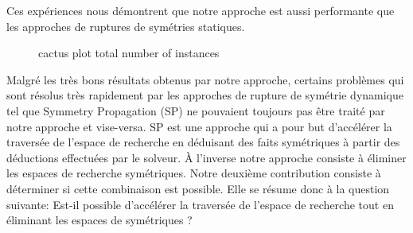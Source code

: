 Ces expériences nous démontrent que notre approche est aussi performante que les approches de ruptures de symétries statiques.
\begin{figure}[!htbp]
	\centering
	\qquad
	\caption{cactus plot  total number of instances}%
	\label{fig:frcactus}%
\end{figure}

Malgré les très bons résultats obtenus par notre approche, certains problèmes qui sont résolus très 
rapidement par les approches de rupture de symétrie dynamique tel que  Symmetry Propagation (SP) ne pouvaient toujours pas être traité par notre approche et vise-versa.
SP est une approche qui a pour but d'accélérer la traversée de l'espace de recherche en déduisant des faits symétriques à partir des déductions effectuées par le solveur.
À l'inverse notre approche consiste à éliminer les espaces de recherche 
symétriques. %
Notre deuxième contribution consiste à déterminer si cette combinaison est possible. Elle se résume donc à la question suivante:
Est-il possible d'accélérer la traversée de l'espace de recherche tout en éliminant les espaces de symétriques ?

